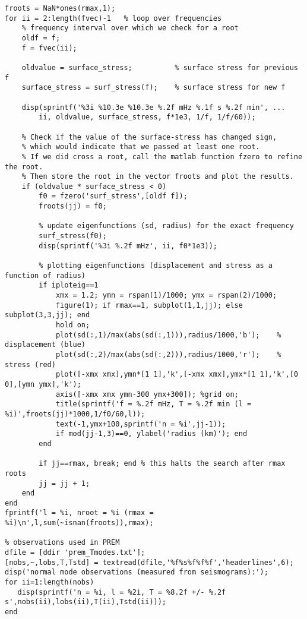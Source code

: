 \documentclass[11pt,titlepage,fleqn]{article}
\begin{document}
\begin{spacing}{1.0}
\begin{verbatim}
froots = NaN*ones(rmax,1);
for ii = 2:length(fvec)-1   % loop over frequencies
    % frequency interval over which we check for a root
    oldf = f;
    f = fvec(ii);

    oldvalue = surface_stress;          % surface stress for previous f
    surface_stress = surf_stress(f);    % surface stress for new f

    disp(sprintf('%3i %10.3e %10.3e %.2f mHz %.1f s %.2f min', ...
        ii, oldvalue, surface_stress, f*1e3, 1/f, 1/f/60));

    % Check if the value of the surface-stress has changed sign,
    % which would indicate that we passed at least one root.
    % If we did cross a root, call the matlab function fzero to refine the root.
    % Then store the root in the vector froots and plot the results.
    if (oldvalue * surface_stress < 0)
        f0 = fzero('surf_stress',[oldf f]);
        froots(jj) = f0;

        % update eigenfunctions (sd, radius) for the exact frequency
        surf_stress(f0);
        disp(sprintf('%3i %.2f mHz', ii, f0*1e3));

        % plotting eigenfunctions (displacement and stress as a function of radius)
        if iploteig==1
            xmx = 1.2; ymn = rspan(1)/1000; ymx = rspan(2)/1000;
            figure(1); if rmax==1, subplot(1,1,jj); else subplot(3,3,jj); end
            hold on;
            plot(sd(:,1)/max(abs(sd(:,1))),radius/1000,'b');    % displacement (blue)
            plot(sd(:,2)/max(abs(sd(:,2))),radius/1000,'r');    % stress (red)
            plot([-xmx xmx],ymn*[1 1],'k',[-xmx xmx],ymx*[1 1],'k',[0 0],[ymn ymx],'k');
            axis([-xmx xmx ymn-300 ymx+300]); %grid on;
            title(sprintf('f = %.2f mHz, T = %.2f min (l = %i)',froots(jj)*1000,1/f0/60,l));
            text(-1,ymx+100,sprintf('n = %i',jj-1));
            if mod(jj-1,3)==0, ylabel('radius (km)'); end
        end
        
        if jj==rmax, break; end % this halts the search after rmax roots
        jj = jj + 1;
    end
end
fprintf('l = %i, nroot = %i (rmax = %i)\n',l,sum(~isnan(froots)),rmax);

% observations used in PREM
dfile = [ddir 'prem_Tmodes.txt'];
[nobs,~,lobs,T,Tstd] = textread(dfile,'%f%s%f%f%f','headerlines',6);
disp('normal mode observations (measured from seismograms):');
for ii=1:length(nobs)
   disp(sprintf('n = %i, l = %2i, T = %8.2f +/- %.2f s',nobs(ii),lobs(ii),T(ii),Tstd(ii))); 
end
\end{verbatim}
\normalsize


\end{spacing}
\end{document}
